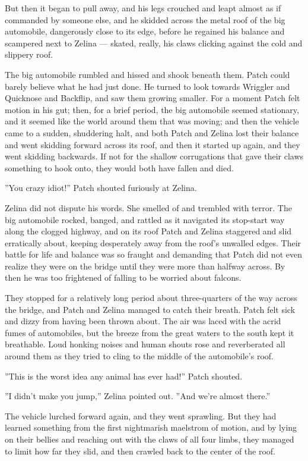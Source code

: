 \documentclass[12pt]{book}
\begin{document}
But then it began to pull away, and his legs crouched and leapt almost as if commanded by someone else, and he skidded across the metal roof of the big automobile, dangerously close to its edge, before he regained his balance and scampered next to Zelina ---
skated, really, his claws clicking against the cold and slippery roof.

The big automobile rumbled and hissed and shook beneath them. Patch could barely believe what he had just done. He turned to look towards Wriggler and Quicknose and Backflip, and saw them growing smaller. For a moment Patch felt motion in his gut; then, for a brief period, the big automobile seemed stationary, and it seemed like the world around them that was moving; and then the vehicle came to a sudden, shuddering halt, and both Patch and Zelina lost their balance and went skidding forward across its roof, and then it started up again, and they went skidding backwards. If not for the shallow corrugations that gave their claws something to hook onto, they would both have fallen and died.

''You crazy idiot!'' Patch shouted furiously at Zelina.

Zelina did not dispute his words. She smelled of and trembled with terror. The big automobile rocked, banged, and rattled as it navigated its stop-start way along the clogged highway, and on its roof Patch and Zelina staggered and slid erratically about, keeping desperately away from the roof's unwalled edges. Their battle for life and balance was so fraught and demanding that Patch did not even realize they were on the bridge until they were more than halfway across. By then he was too frightened of falling to be worried about falcons.

They stopped for a relatively long period about three-quarters of the way across the bridge, and Patch and Zelina managed to catch their breath. Patch felt sick and dizzy from having been thrown about. The air was laced with the acrid fumes of automobiles, but the breeze from the great waters to the south kept it breathable. Loud honking noises and human shouts rose and reverberated all around them as they tried to cling to the middle of the automobile's roof.

''This is the worst idea any animal has ever had!'' Patch shouted.

''I didn't make you jump,'' Zelina pointed out. ''And we're almost there.''

The vehicle lurched forward again, and they went sprawling. But they had learned something from the first nightmarish maelstrom of motion, and by lying on their bellies and reaching out with the claws of all four limbs, they managed to limit how far they slid, and then crawled back to the center of the roof.
\end{document}
